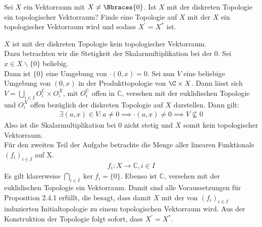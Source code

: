\begin{exercise}

Sei $X$ ein Vektorraum mit $X \neq \Bbraces{0}$. Ist $X$ mit der diskreten Topologie ein topologischer Vektorraum?
Finde eine Topologie auf $X$ mit der $X$ ein topologischer Vektorraum wird und sodass $X^\prime = X^\ast$ ist.

\end{exercise}

\begin{solution}
$X$ ist mit der diskreten Topologie kein topologischer Vektorraum. \\
Dazu betrachten wir die Stetigkeit der Skalarmultiplikation bei der $0$.
Sei $x \in X\backslash\{0\}$ beliebig. \\
Dann ist $\{0\}$ eine Umgebung von $\cdot(0,x) = 0$.
Sei nun $V$ eine beliebige Umgebung von $(0,x)$ in der Produkttopologie von $\C \times X$.
Dann lässt sich $V = \bigcup_{i \in I}O_i^{\mathbb{C}}\times O_i^X$, mit
$O_i^{\mathbb{C}}$ offen in $\mathbb{C}$, versehen mit der euklidischen Topologie
und $O_i^X$ offen bezüglich der diskreten Topologie auf $X$ darstellen.
Dann gilt:
\begin{align*}
  \exists (a,x) \in V: a \neq 0 \implies \cdot(a,x) \neq 0 \implies V \nsubseteq {0}
\end{align*}
Also ist die Skalarmultiplikation bei 0 nicht stetig und $X$ somit kein topologischer
Vektorraum.
\\
Für den zweiten Teil der Aufgabe betrachte die Menge aller linearen Funktionale $(f_i)_{i \in I}$ auf X.
\begin{align*}
  f_i: X \rightarrow \mathbb{C}, i \in I
\end{align*}
Es gilt klarerweise $\bigcap_{i\in I}\ker f_i = \{0\}$.
Ebenso ist $\mathbb{C}$, versehen mit der euklidischen Topologie ein Vektorraum.
Damit sind alle Voraussetzungen für Proposition 2.4.1 erfüllt, die besagt, dass
damit $X$ mit der von $(f_i)_{i\in I}$ induzierten Initialtopologie zu einem topologischen Vektorraum wird.
Aus der Konstruktion der Topologie folgt sofort, dass $X^\prime = X^\ast$.
\end{solution}

